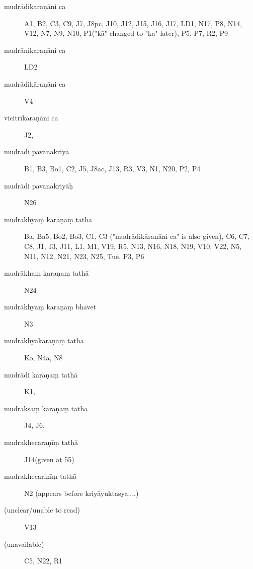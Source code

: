 \begin{ekdosis}
\begin{marma}[hp01_055]
\begin{marma}[hp01_056]
      \begin{description}
      \item[mudrādikaraṇāni ca] A1, B2, C3, C9, J7, J8pc, J10, J12, J15, J16, J17, LD1, N17, P8, N14, V12, N7, N9, N10, P1("kā" changed to "ka" later), P5, P7, R2, P9
      \item[mudrānikaraṇāni ca] LD2
      \item[mudrādikāraṇāni ca]        V4
      \item[vicitrīkaraṇāni ca]        J2,
      \item[mudrādi pavanakriyā]        B1, B3, Bo1, C2, J5, J8ac, J13, R3, V3, N1, N20, P2, P4
      \item[mudrādi pavanakriyāḥ]   N26
      \item[mudrākhyaṃ karaṇaṃ tathā] Ba, Ba5, Bo2, Bo3, C1, C3 ("mudrādikāraṇāni ca" is also given), C6, C7, C8, J1, J3, J11, L1, M1, V19, R5, N13, N16, N18, N19, V10, V22, N5, N11, N12, N21, N23, N25, Tue, P3, P6
      \item[mudrākhaṃ karaṇaṃ tathā]   N24
      \item[mudrākhyaṃ karaṇaṃ bhavet]   N3
      \item[mudrākhyakaraṇaṃ tathā]        Ko, N4a, N8
      \item[mudrādi karaṇaṃ tathā]        K1,
      \item[mudrākṣaṃ karaṇaṃ tathā]        J4, J6,
      \item[mudrakhecaraṇīṃ tathā]        J14(given at 55)
      \item[mudrakhecariṇīṃ tathā]        N2 (appears before kriyāyuktasya....)
      \item[(unclear/unable to read)]        V13
      \item[(unavailable)]         C5, N22, R1
      \end{description}
    \end{marma}



\end{marma}
\end{ekdosis}
